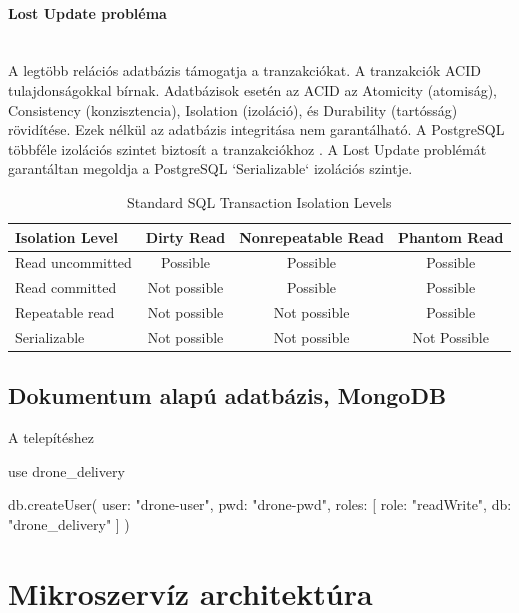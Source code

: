 \paragraph{Lost Update probléma} \mbox{} \\
A legtöbb relációs adatbázis támogatja a tranzakciókat. A tranzakciók ACID tulajdonságokkal bírnak.
Adatbázisok esetén az ACID az Atomicity (atomiság), Consistency (konzisztencia), Isolation (izoláció), és Durability (tartósság) rövidítése. Ezek nélkül az adatbázis integritása nem garantálható.
A PostgreSQL többféle izolációs szintet biztosít a tranzakciókhoz \cite{postgres-transaction}. A Lost Update problémát garantáltan megoldja a PostgreSQL `Serializable` izolációs szintje.
\begin{table}[h]
    \centering
    \caption{ Standard SQL Transaction Isolation Levels}
    \begin{tabular}{l|c|c|c|}
Isolation Level & Dirty Read  & Nonrepeatable Read & Phantom Read\\
        \hline
Read uncommitted  & Possible & Possible & Possible \\
\hline
Read committed & Not possible & Possible & Possible \\
\hline
Repeatable read & Not possible & Not possible & Possible \\
\hline
Serializable & Not possible & Not possible & Not Possible \\
        \hline
    \end{tabular}
\end{table}

\subsection{Dokumentum alapú adatbázis, MongoDB}

A telepítéshez
\begin{python}
    use drone_delivery
\end{python}

\begin{python}

    db.createUser(
        {
        user: "drone-user",
        pwd: "drone-pwd",
        roles: [
            {
            role: "readWrite",
            db: "drone_delivery"
        }
        ]
    }
    )
\end{python}

\section{Mikroszervíz architektúra}
